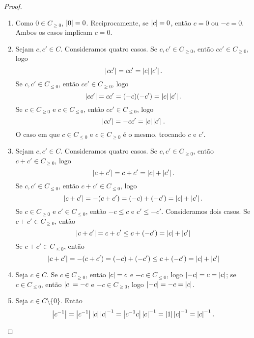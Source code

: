 \begin{proof}
	\begin{enumerate}
	\item Como $0 \in C_{\geq 0}$, $\left\vert{0}\right\vert=0$. Reciprocamente, se $\left\vert{c}\right\vert=0$, então $c=0$ ou $-c=0$. Ambos os casos implicam $c=0$.

	\item Sejam $c,c' \in C$. Consideramos quatro casos. Se $c,c' \in C_{\geq 0}$, então $cc' \in C_{\geq 0}$, logo
	\begin{equation*}
	\left\vert{cc'}\right\vert = cc' = \left\vert{c}\right\vert\left\vert{c'}\right\vert.
	\end{equation*}
Se $c,c' \in C_{\leq 0}$, então $cc' \in C_{\geq 0}$, logo
	\begin{equation*}
	\left\vert{cc'}\right\vert = cc' = (-c)(-c') =\left\vert{c}\right\vert\left\vert{c'}\right\vert.
	\end{equation*}
Se $c \in C_{\geq 0}$ e $c \in C_{\leq 0}$, então $cc' \in C_{\leq 0}$, logo
	\begin{equation*}
	\left\vert{cc'}\right\vert = -cc' = \left\vert{c}\right\vert\left\vert{c'}\right\vert.
	\end{equation*}
O caso em que $c \in C_{\leq 0}$ e $c \in C_{\geq 0}$ é o mesmo, trocando $c$ e $c'$.

	\item Sejam $c,c' \in C$. Consideramos quatro casos. Se $c,c' \in C_{\geq 0}$, então $c+c' \in C_{\geq 0}$, logo
	\begin{equation*}
	\left\vert{c+c'}\right\vert = c+c' = \left\vert{c}\right\vert+\left\vert{c'}\right\vert.
	\end{equation*}
Se $c,c' \in C_{\leq 0}$, então $c+c' \in C_{\leq 0}$, logo
	\begin{equation*}
	\left\vert{c+c'}\right\vert = -(c+c') = (-c)+(-c') = \left\vert{c}\right\vert+\left\vert{c'}\right\vert.
	\end{equation*}
Se $c \in C_{\geq 0}$ e $c' \in C_{\leq 0}$, então $-c \leq c$ e $c' \leq -c'$. Consideramos dois casos. Se $c+c' \in C_{\geq 0}$, então
	\begin{equation*}
	\left\vert{c+c'}\right\vert = c+c' \leq c+(-c') = \left\vert{c}\right\vert+\left\vert{c'}\right\vert
	\end{equation*}
Se $c+c' \in C_{\leq 0}$, então
	\begin{equation*}
	\left\vert{c+c'}\right\vert = -(c+c') = (-c)+(-c') \leq c+(-c') = \left\vert{c}\right\vert+\left\vert{c'}\right\vert
	\end{equation*}

	\item Seja $c \in C$. Se $c \in C_{\geq 0}$, então $\left\vert{c}\right\vert=c$ e $-c \in C_{\leq 0}$, logo $\left\vert{-c}\right\vert= c = \left\vert{c}\right\vert$; se $c \in C_{\leq 0}$, então $\left\vert{c}\right\vert=-c$ e $-c \in C_{\geq 0}$, logo $\left\vert{-c}\right\vert = -c = \left\vert{c}\right\vert$.

	\item Seja $c \in C \setminus \{0\}$. Então
		\begin{equation*}
		\left\vert{c^{-1}}\right\vert = \left\vert{c^{-1}}\right\vert\left\vert{c}\right\vert\left\vert{c}\right\vert^{-1} = \left\vert{c^{-1}c}\right\vert\left\vert{c}\right\vert^{-1} = \left\vert{1}\right\vert\left\vert{c}\right\vert^{-1} = \left\vert{c}\right\vert^{-1}.
		\end{equation*}
	\end{enumerate}
\end{proof}

